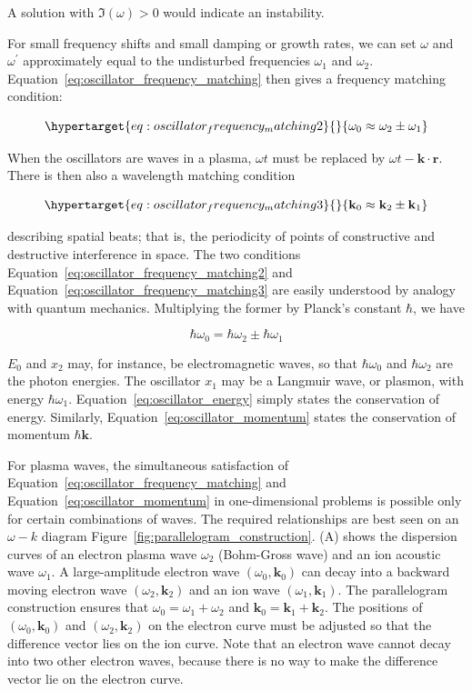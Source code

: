 \documentclass[
  notoc %
]{tufte-book}
\begin{document}
A solution with \(\Im(\omega)>0\) would indicate an instability.

For small frequency shifts and small damping or growth rates, we can set
\(\omega\) and \(\omega^\prime\) approximately equal to the undisturbed
frequencies \(\omega_1\) and \(\omega_2\).
Equation~\ref{eq:oscillator_frequency_matching} then gives a frequency
matching condition:

\begin{equation}\protect\hypertarget{eq:oscillator_frequency_matching2}{}{
\omega_0 \approx \omega_2 \pm \omega_1
}\label{eq:oscillator_frequency_matching2}\end{equation}

When the oscillators are waves in a plasma, \(\omega t\) must be
replaced by \(\omega t - \mathbf{k}\cdot\mathbf{r}\). There is then also
a wavelength matching condition

\begin{equation}\protect\hypertarget{eq:oscillator_frequency_matching3}{}{
\mathbf{k}_0 \approx \mathbf{k}_2 \pm \mathbf{k}_1
}\label{eq:oscillator_frequency_matching3}\end{equation}

describing spatial beats; that is, the periodicity of points of
constructive and destructive interference in space. The two conditions
Equation~\ref{eq:oscillator_frequency_matching2} and
Equation~\ref{eq:oscillator_frequency_matching3} are easily understood
by analogy with quantum mechanics. Multiplying the former by Planck's
constant \(\hbar\), we have

\[
\hbar\omega_0 = \hbar\omega_2 \pm \hbar\omega_1
\]

\(E_0\) and \(x_2\) may, for instance, be electromagnetic waves, so that
\(\hbar\omega_0\) and \(\hbar\omega_2\) are the photon energies. The
oscillator \(x_1\) may be a Langmuir wave, or plasmon, with energy
\(\hbar\omega_1\). Equation~\ref{eq:oscillator_energy} simply states the
conservation of energy. Similarly, Equation~\ref{eq:oscillator_momentum}
states the conservation of momentum \(\hbar\mathbf{k}\).

For plasma waves, the simultaneous satisfaction of
Equation~\ref{eq:oscillator_frequency_matching} and
Equation~\ref{eq:oscillator_momentum} in one-dimensional problems is
possible only for certain combinations of waves. The required
relationships are best seen on an \(\omega-k\) diagram
Figure~\ref{fig:parallelogram_construction}. (A) shows the dispersion
curves of an electron plasma wave \(\omega_2\) (Bohm-Gross wave) and an
ion acoustic wave \(\omega_1\). A large-amplitude electron wave
\((\omega_0, \mathbf{k}_0)\) can decay into a backward moving electron
wave \((\omega_2, \mathbf{k}_2)\) and an ion wave
\((\omega_1, \mathbf{k}_1)\). The parallelogram construction ensures
that \(\omega_0 = \omega_1 + \omega_2\) and
\(\mathbf{k}_0 = \mathbf{k}_1 + \mathbf{k}_2\). The positions of
\((\omega_0, \mathbf{k}_0)\) and \((\omega_2, \mathbf{k}_2)\) on the
electron curve must be adjusted so that the difference vector lies on
the ion curve. Note that an electron wave cannot decay into two other
electron waves, because there is no way to make the difference vector
lie on the electron curve.
\end{document}
